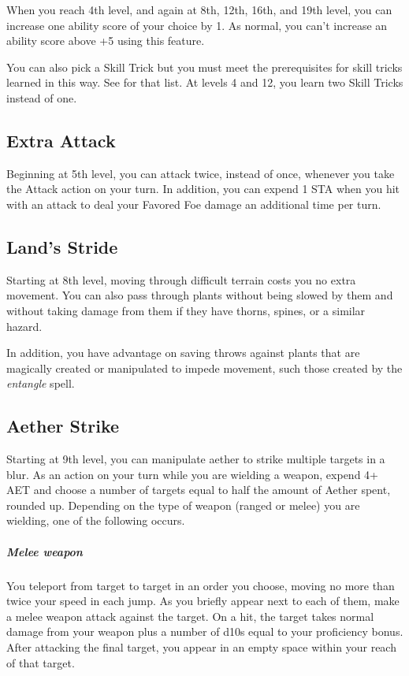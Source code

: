 When you reach 4th level, and again at 8th, 12th, 16th, and 19th level, you can increase one ability score of your choice by 1. As normal, you can't increase an ability score above +5 using this feature.

You can also pick a Skill Trick but you must meet the prerequisites for skill tricks learned in this way. See  for that list. At levels 4 and 12, you learn two Skill Tricks instead of one.

\subsection{Extra Attack}

Beginning at 5th level, you can attack twice, instead of once, whenever you take the Attack action on your turn. In addition, you can expend 1 STA when you hit with an attack to deal your Favored Foe damage an additional time per turn. 

\subsection{Land's Stride}

Starting at 8th level, moving through difficult terrain costs you no extra movement. You can also pass through plants without being slowed by them and without taking damage from them if they have thorns, spines, or a similar hazard.

In addition, you have advantage on saving throws against plants that are magically created or manipulated to impede movement, such those created by the \textit{entangle} spell.

\subsection{Aether Strike}

Starting at 9th level, you can manipulate aether to strike multiple targets in a blur. As an action on your turn while you are wielding a weapon, expend 4+ AET and choose a number of targets equal to half the amount of Aether spent, rounded up. Depending on the type of weapon (ranged or melee) you are wielding, one of the following occurs.

\subparagraph*{Melee weapon} You teleport from target to target in an order you choose, moving no more than twice your speed in each jump. As you briefly appear next to each of them, make a melee weapon attack against the target. On a hit, the target takes normal damage from your weapon plus a number of d10s equal to your proficiency bonus. After attacking the final target, you appear in an empty space within your reach of that target.

